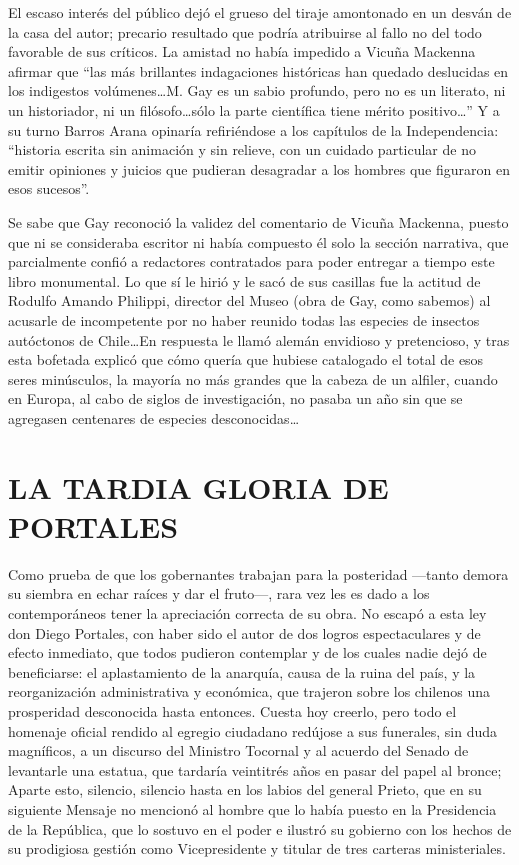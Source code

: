 \documentclass[10pt,twoside,openright]{memoir}
\begin{document}
El escaso interés del público dejó el grueso del tiraje amontonado en un
desván de la casa del autor; precario resultado que podría atribuirse al
fallo no del todo favorable de sus críticos. La amistad no había
impedido a Vicuña Mackenna afirmar que ``las más brillantes indagaciones
históricas han quedado deslucidas en los indigestos volúmenes\ldots M. Gay
es un sabio profundo, pero no es un literato, ni un historiador, ni un
filósofo\ldots sólo la parte científica tiene mérito positivo\ldots'' Y a su
turno Barros Arana opinaría refiriéndose a los capítulos de la
Independencia: ``historia escrita sin animación y sin relieve, con un
cuidado particular de no emitir opiniones y juicios que pudieran
desagradar a los hombres que figuraron en esos sucesos''.

Se sabe que Gay reconoció la validez del comentario de Vicuña Mackenna,
puesto que ni se consideraba escritor ni había compuesto él solo la
sección narrativa, que parcialmente confió a redactores contratados para
poder entregar a tiempo este libro monumental. Lo que sí le hirió y le
sacó de sus casillas fue la actitud de Rodulfo Amando Philippi, director
del Museo (obra de Gay, como sabemos) al acusarle de incompetente por no
haber reunido todas las especies de insectos autóctonos de Chile\ldots En
respuesta le llamó alemán envidioso y pretencioso, y tras esta bofetada
explicó que cómo quería que hubiese catalogado el total de esos seres
minúsculos, la mayoría no más grandes que la cabeza de un alfiler,
cuando en Europa, al cabo de siglos de investigación, no pasaba un año
sin que se agregasen centenares de especies desconocidas\ldots

\chapter{LA TARDIA GLORIA DE PORTALES}

Como prueba de que los gobernantes trabajan para la posteridad ---tanto
demora su siembra en echar raíces y dar el fruto---, rara vez les es
dado a los contemporáneos tener la apreciación correcta de su obra. No
escapó a esta ley don Diego Portales, con haber sido el autor de dos
logros espectaculares y de efecto inmediato, que todos pudieron
contemplar y de los cuales nadie dejó de beneficiarse: el aplastamiento
de la anarquía, causa de la ruina del país, y la reorganización
administrativa y económica, que trajeron sobre los chilenos una
prosperidad desconocida hasta entonces. Cuesta hoy creerlo, pero todo el
homenaje oficial rendido al egregio ciudadano redújose a sus funerales,
sin duda magníficos, a un discurso del Ministro Tocornal y al acuerdo
del Senado de levantarle una estatua, que tardaría veintitrés años en
pasar del papel al bronce; Aparte esto, silencio, silencio hasta en los
labios del general Prieto, que en su siguiente Mensaje no mencionó al
hombre que lo había puesto en la Presidencia de la República, que lo
sostuvo en el poder e ilustró su gobierno con los hechos de su
prodigiosa gestión como Vicepresidente y titular de tres carteras
ministeriales.
\end{document}
